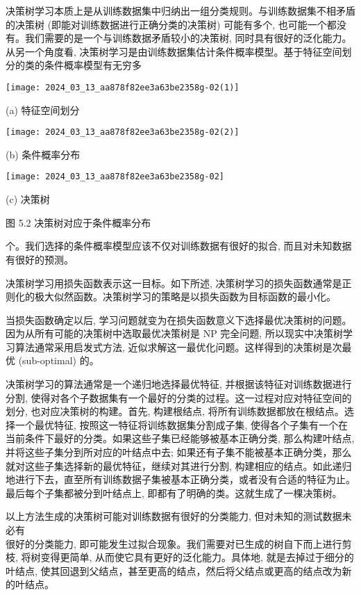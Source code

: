 \documentclass[10pt]{article}
\begin{document}
\begin{CJK*}{UTF8}{bsmi}
决策树学习本质上是从训练数据集中归纳出一组分类规则。与训练数据集不相矛盾的决策树 (即能对训练数据进行正确分类的决策树) 可能有多个, 也可能一个都没有。我们需要的是一个与训练数据矛盾较小的决策树, 同时具有很好的泛化能力。从另一个角度看, 决策树学习是由训练数据集估计条件概率模型。基于特征空间划分的类的条件概率模型有无穷多

\begin{center}
\texttt{[image: 2024\_03\_13\_aa878f82ee3a63be2358g-02(1)]}
\end{center}

(a) 特征空间划分

\begin{center}
\texttt{[image: 2024\_03\_13\_aa878f82ee3a63be2358g-02(2)]}
\end{center}

(b) 条件概率分布

\begin{center}
\texttt{[image: 2024\_03\_13\_aa878f82ee3a63be2358g-02]}
\end{center}

(c) 决策树

图 5.2 决策树对应于条件概率分布

个。我们选择的条件概率模型应该不仅对训练数据有很好的拟合, 而且对未知数据有很好的预测。

决策树学习用损失函数表示这一目标。如下所述, 决策树学习的损失函数通常是正则化的极大似然函数。决策树学习的策略是以损失函数为目标函数的最小化。

当损失函数确定以后, 学习问题就变为在损失函数意义下选择最优决策树的问题。因为从所有可能的决策树中选取最优决策树是 NP 完全问题, 所以现实中决策树学习算法通常采用启发式方法, 近似求解这一最优化问题。这样得到的决策树是次最优 (sub-optimal) 的。

决策树学习的算法通常是一个递归地选择最优特征, 并根据该特征对训练数据进行分割, 使得对各个子数据集有一个最好的分类的过程。这一过程对应对特征空间的划分, 也对应决策树的构建。首先, 构建根结点, 将所有训练数据都放在根结点。选择一个最优特征, 按照这一特征将训练数据集分割成子集, 使得各个子集有一个在当前条件下最好的分类。如果这些子集已经能够被基本正确分类, 那么构建叶结点, 并将这些子集分到所对应的叶结点中去; 如果还有子集不能被基本正确分类，那么就对这些子集选择新的最优特征，继续对其进行分割, 构建相应的结点。如此递归地进行下去，直至所有训练数据子集被基本正确分类，或者没有合适的特征为止。最后每个子集都被分到叶结点上, 即都有了明确的类。这就生成了一棵决策树。

以上方法生成的决策树可能对训练数据有很好的分类能力, 但对未知的测试数据未必有\\
很好的分类能力, 即可能发生过拟合现象。我们需要对已生成的树自下而上进行剪枝, 将树变得更简单, 从而使它具有更好的泛化能力。具体地, 就是去掉过于细分的叶结点, 使其回退到父结点，甚至更高的结点，然后将父结点或更高的结点改为新的叶结点。


\end{CJK*}
\end{document}
